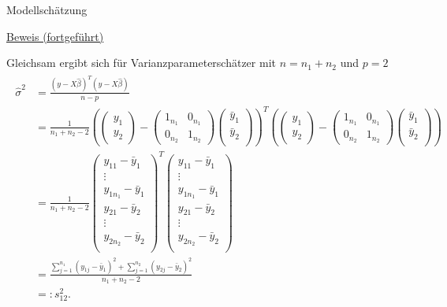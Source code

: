 \documentclass[
  8pt,
  ignorenonframetext,
]{beamer}
\begin{document}
\begin{frame}{Modellschätzung}
\protect\hypertarget{modellschuxe4tzung-4}{}
\footnotesize

\underline{Beweis (fortgeführt)}

Gleichsam ergibt sich für Varianzparameterschätzer mit \(n = n_1 + n_2\)
und \(p = 2\) \begin{align}
\begin{split}
\hat{\sigma}^{2}
& =
\frac{(y-X\hat{\beta})^T(y - X\hat{\beta})}{n - p} \\
& =
\frac{1}{n_1+n_2-2}
\left(
\begin{pmatrix} y_1 \\ y_2 \end{pmatrix}
-
\begin{pmatrix} 1_{n_1} & 0_{n_1} \\ 0_{n_2} & 1_{n_2} \end{pmatrix}
\begin{pmatrix}
\bar{y}_{1}\\
\bar{y}_{2}\\
\end{pmatrix}
\right)^{T}
\left(
\begin{pmatrix} y_1 \\ y_2 \end{pmatrix}
-
\begin{pmatrix} 1_{n_1} & 0_{n_1} \\ 0_{n_2} & 1_{n_2} \end{pmatrix}
\begin{pmatrix}
\bar{y}_{1}\\
\bar{y}_{2}\\
\end{pmatrix} \right) \\
& =\frac{1}{n_1+n_2-2}
\begin{pmatrix}
y_{11}-\bar{y}_{1}\\
\vdots \\
y_{1n_1}-\bar{y}_{1}\\
y_{21}-\bar{y}_{2}\\
\vdots \\
y_{2n_2}-\bar{y}_{2}\\
\end{pmatrix}^{T}
\begin{pmatrix}
y_{11}-\bar{y}_{1}\\
\vdots \\
y_{1n_1}-\bar{y}_{1}\\
y_{21}-\bar{y}_{2}\\
\vdots \\
y_{2n_2}-\bar{y}_{2}\\
\end{pmatrix} \\
& = \frac{
    \sum_{j=1}^{n_1} (y_{1j}-\bar{y}_{1})^{2}
   +\sum_{j=1}^{n_2} (y_{2j}-\bar{y}_{2})^{2}
   }{n_1+n_2-2}
\\
& =: s_{12}^2.
\end{split}
\end{align}
\end{frame}
\end{document}
